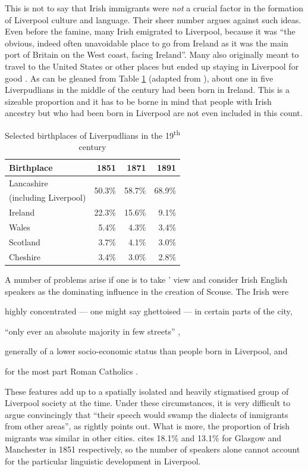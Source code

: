 This is not to say that Irish immigrants were \emph{not} a crucial factor in the formation of Liverpool culture and language.
Their sheer number argues against such ideas.
Even before the famine, many Irish emigrated to Liverpool, because it was ``the obvious, indeed often unavoidable place to go from Ireland as it was the main port of Britain on the West coast, facing Ireland''.
Many also originally meant to travel to the United States or other places but ended up staying in Liverpool for good  \citep[cf.][114 and 117]{honeybone2007}.
As can be gleaned from Table \ref{tab.birthplace} (adapted from \cite[249]{pooley2006}), about one in five Liverpudlians in the middle of the century had been born in Ireland.
This is a sizeable proportion and it has to be borne in mind that people with Irish ancestry but who had been born in Liverpool are not even included in this count.

	\begin{table}[h]
		\centering
		\caption{Selected birthplaces of Liverpudlians in the 19\textsuperscript{th} century}
		\begin{tabular}{lrrr}
			\hline
			Birthplace & 1851 & 1871 & 1891 \\ 
			\hline
			Lancashire & \multirow{2}{*}{50.3\%} & \multirow{2}{*}{58.7\%} & \multirow{2}{*}{68.9\%} \\
			(including Liverpool) & & & \\
			Ireland & 22.3\% & 15.6\% & 9.1\% \\ 
			Wales & 5.4\% & 4.3\% & 3.4\% \\ 
			Scotland & 3.7\% & 4.1\% & 3.0\% \\
			Cheshire & 3.4\% & 3.0\% & 2.8\% \\ 
			\hline
		\end{tabular}
		\label{tab.birthplace}
	\end{table}

A number of problems arise if one is to take \citeauthor{knowles1973}' view and consider Irish English speakers as the dominating influence in the creation of Scouse.
The Irish were
\begin{inparaenum}[a\upshape)]
	\item highly concentrated --- one might say ghettoised --- in certain parts of the city, 
	\item ``only ever an absolute majority in few streets'' \citep[120]{honeybone2007}, 
	\item generally of a lower socio-economic status than people born in Liverpool, and
	\item for the most part Roman Catholics \citep[cf.][330]{belchemmacraild2006}.
\end{inparaenum}
These features add up to a spatially isolated and heavily stigmatised group of Liverpool society at the time.
Under these circumstances, it is very difficult to argue convincingly that ``their speech would swamp the dialects of inmigrants from other areas'', as \citet[120]{honeybone2007} rightly points out.
What is more, the proportion of Irish migrants was similar in other cities.
\citet[140]{honeybone2007} cites 18.1\% and 13.1\% for Glasgow and Manchester in 1851 respectively, so the number of speakers alone cannot account for the particular linguistic development in Liverpool.

